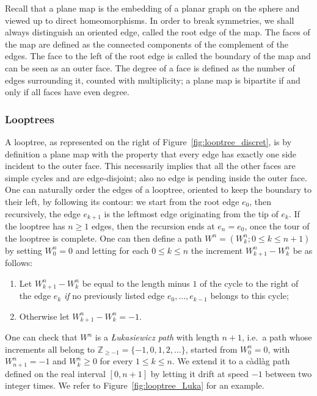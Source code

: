 \documentclass[british, a4paper,11pt]{article}
\numberwithin{equation}{section}
\theoremstyle{definition}
\newcommand{\Z}{\mathbb{Z}}
\begin{document}
Recall that a plane map is the embedding of a planar graph on the sphere and viewed up to direct homeomorphisms. In order to break symmetries, we shall always distinguish an oriented edge, called the root edge of the map. The faces of the map are defined as the connected components of the complement of the edges. The face to the left of the root edge is called the boundary of the map and can be seen as an outer face. The degree of a face is defined as the number of edges surrounding it, counted with multiplicity; a plane map is bipartite if and only if all faces have even degree.

\subsubsection*{Looptrees}

A looptree, as represented on the right of Figure~\ref{fig:looptree_discret}, is by definition a plane map with the property that every edge has exactly one side incident to the outer face. 
This necessarily implies that all the other faces are simple cycles and are edge-disjoint; also no edge is pending inside the outer face.
One can naturally order the edges of a looptree, oriented to keep the boundary to their left, by following its contour: we start from the root edge $e_0$, then recursively, the edge $e_{k+1}$ is the leftmost edge originating from the tip of $e_k$. If the looptree has $n \geq 1$ edges, then the recursion ends at $e_n = e_0$, once the tour of the looptree is complete.
One can then define a path $W^{n} = (W^{n}_k ; 0 \leq k \leq n+1)$ by setting $W^n_0 = 0$ and letting for each $0 \leq k \leq n$ the increment $W^n_{k+1}-W^n_{k}$ be as follows:
\begin{enumerate}
\item Let $W^n_{k+1}-W^n_{k}$ be equal to the length minus $1$ of the cycle to the right of the edge $e_{k}$ \emph{if} no previously listed edge $e_0, \dots, e_{k-1}$ belongs to this cycle;
\item Otherwise let $W^n_{k+1}-W^n_{k} = -1$.
\end{enumerate}
One can check that $W^{n}$ is a \emph{{\L}ukasiewicz path} with length $n+1$, i.e.~a path whose increments all belong to $\Z_{\geq -1} = \{-1, 0, 1, 2, \dots\}$, started from $W^{n}_0 = 0$, with $W^{n}_{n+1} = -1$ and $W^{n}_{k} \geq 0$ for every $1 \leq k \leq n$. We extend it to a c\`adl\`ag path defined on the real interval $[0, n+1]$ by letting it drift at speed $-1$ between two integer times.
We refer to Figure~\ref{fig:looptree_Luka} for an example.
\end{document}
